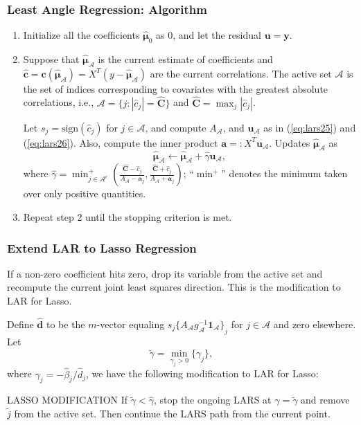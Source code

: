 \begin{frame}
\frametitle{Least Angle Regression: Algorithm}
\begin{enumerate}
    \item Initialize all the coefficients $\hat{\mathbf{\mu}}_0$ as 0, and let the residual $\mathbf{u}=\mathbf{y}$.
    \item Suppose that $\hat{\mathbf{\mu}}_\mathcal{A}$ is the current estimate of coefficients and $\hat{\mathbf{c}}=\mathbf{c}(\hat{\mathbf{\mu}}_\mathcal{A})=X^T(y-\hat{\mathbf{\mu}}_\mathcal{A})$ are the current correlations. The active set $\mathcal{A}$ is the set of indices corresponding to covariates with the greatest absolute correlations, i.e., $\mathcal{A}=\{j:|\hat{c}_j|=\hat{\mathbf{C}}\}$ and $\hat{\mathbf{C}}=\max_{j}|\hat{c}_j|$.
    
    Let $s_j=\text{sign}(\hat{c}_j)$ for $j\in\mathcal{A}$, and compute $A_\mathcal{A}$, and $\mathbf{u}_\mathcal{A}$ as in (\ref{eq:lars25}) and (\ref{eq:lars26}). Also, compute the inner product $\mathbf{a}=:X^T\mathbf{u}_\mathcal{A}$. Updates $\hat{\mathbf{\mu}}_\mathcal{A}$ as
    \begin{equation}\label{eq:lars212}
        \hat{\mathbf{\mu}}_\mathcal{A}\leftarrow\hat{\mathbf{\mu}}_\mathcal{A}+\hat{\gamma}\mathbf{u}_\mathcal{A},
    \end{equation}
    where $\hat{\gamma}=\min_{j\in\mathcal{A}^c}^+\left(\frac{\hat{\mathbf{C}}-\hat{c}_j}{A_\mathcal{A}-\mathbf{a}_j}, \frac{\hat{\mathbf{C}}+\hat{c}_j}{A_\mathcal{A}+\mathbf{a}_j}\right)$; ``$\min^+$'' denotes the minimum taken over only positive quantities.
    \item Repeat step 2 until the stopping criterion is met.
\end{enumerate}
    
\end{frame}

\begin{frame}
\frametitle{Extend LAR to Lasso Regression}
If a non-zero coefficient hits zero, drop its variable from the active set and recompute the current joint least squares direction. This is the modification to LAR for Lasso.

Define $\hat{\mathbf{d}}$ to be the $m$-vector equaling $s_j{ \{A_\mathcal{A} g^{-1}_\mathcal{A} \mathbf{1}_\mathcal{A}\}}_j$ for $j\in\mathcal{A}$ and zero elsewhere. Let $$\tilde{\gamma}=\min_{\gamma_j>0}\{\gamma_j\},$$ where $\gamma_j=-\hat{\beta}_j/\hat{d}_j$, we have the following modification to LAR for Lasso:

\begin{block}{LASSO MODIFICATION}
If $\tilde{\gamma}<\hat{\gamma}$, stop the ongoing LARS at $\gamma=\tilde{\gamma}$ and remove $\tilde{j}$ from the active set. Then continue the LARS path from the current point.
\end{block}
\end{frame}


